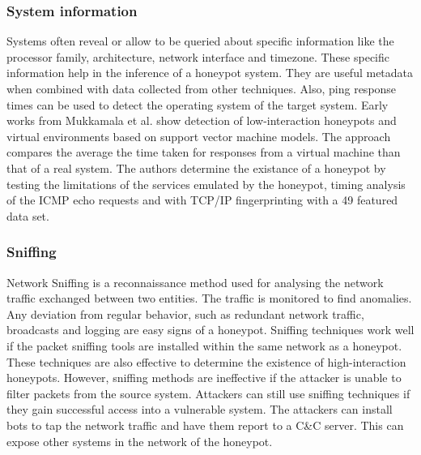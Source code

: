 \documentclass[letterpaper, 10 pt, conference]{ieeeconf}  %
\begin{document}
\subsubsection{System information}
Systems often reveal or allow to be queried about specific information like the processor family, architecture, network interface and timezone. These specific information help in the inference of a honeypot system. They are useful metadata when combined with data collected from other techniques.  Also, ping response times can be used to detect the operating system of the target system. Early works from Mukkamala et al. \cite{mukkamala} show detection of low-interaction honeypots and virtual environments based on support vector machine models. The approach compares the average the time taken for responses from a virtual machine than that of a real system. The authors determine the existance of a honeypot by testing the limitations of the services emulated by the honeypot, timing analysis of the ICMP echo requests and with TCP/IP fingerprinting with a 49 featured data set.  
\newline
\subsubsection{Sniffing}
Network Sniffing is a reconnaissance method used for analysing the network traffic exchanged between two entities. The traffic is monitored to find anomalies. Any deviation from regular behavior, such as redundant network traffic, broadcasts and logging are easy signs of a honeypot. Sniffing techniques work well if the packet sniffing tools are installed within the same network as a honeypot. These techniques are also effective to determine the existence of high-interaction honeypots. However, sniffing methods are ineffective if the attacker is unable to filter packets from the source system. Attackers can still use sniffing techniques if they gain successful access into a vulnerable system. The attackers can install bots to tap the network traffic and have them report to a C\&C server. This can expose other systems in the network of the honeypot. 
\newline
\end{document}
